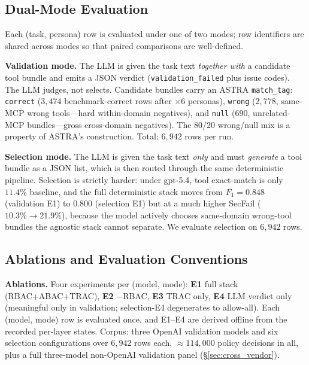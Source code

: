 \documentclass[sigconf,review,anonymous]{acmart}
\begin{document}
\subsection{Dual-Mode Evaluation}
\label{sec:dual_mode}

Each (task, persona) row is evaluated under one of two modes; row identifiers are shared across modes so that paired comparisons are well-defined.

\textbf{Validation mode.} The LLM is given the task text \emph{together with} a candidate tool bundle and emits a JSON verdict (\texttt{validation\_failed} plus issue codes). The LLM judges, not selects. Candidate bundles carry an ASTRA \texttt{match\_tag}: \texttt{correct} ($3{,}474$ benchmark-correct rows after $\times 6$ personas), \texttt{wrong} ($2{,}778$, same-MCP wrong tools---hard within-domain negatives), and \texttt{null} ($690$, unrelated-MCP bundles---gross cross-domain negatives). The $80/20$ wrong/null mix is a property of ASTRA's construction. Total: $6{,}942$ rows per run.

\textbf{Selection mode.} The LLM is given the task text \emph{only} and must \emph{generate} a tool bundle as a JSON list, which is then routed through the same deterministic pipeline. Selection is strictly harder: under gpt-5.4, tool exact-match is only $11.4\%$ baseline, and the full deterministic stack moves from $F_1=0.848$ (validation E1) to $0.800$ (selection E1) but at a much higher SecFail ($10.3\%\!\to\!21.9\%$), because the model actively chooses same-domain wrong-tool bundles the agnostic stack cannot separate. We evaluate selection on $6{,}942$ rows.

\subsection{Ablations and Evaluation Conventions}
\label{sec:ablation_design}
\label{sec:conventions}
\label{sec:eval_metrics}

\textbf{Ablations.} Four experiments per (model, mode): \textbf{E1} full stack (RBAC+ABAC+TRAC), \textbf{E2} $-$RBAC, \textbf{E3} TRAC only, \textbf{E4} LLM verdict only (meaningful only in validation; selection-E4 degenerates to allow-all). Each (model, mode) row is evaluated once, and E1--E4 are derived offline from the recorded per-layer states. Corpus: three OpenAI validation models and six selection configurations over $6{,}942$ rows each, $\approx 114{,}000$ policy decisions in all, plus a full three-model non-OpenAI validation panel (\S\ref{sec:cross_vendor}).
\end{document}
